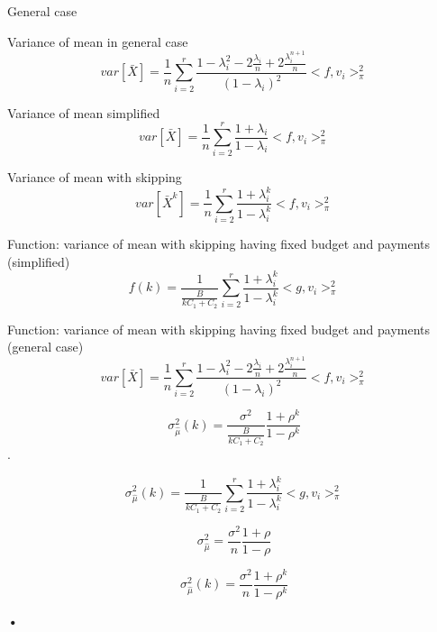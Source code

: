 \documentclass[12pt]{report}
\begin{document}
General case

Variance of mean in general case
$$ var\left[\bar{X} \right] = \frac{1}{n} \sum_{i=2}^r\frac{1-\lambda_i^2 - 2\frac{\lambda_i}{n} + 2\frac{\lambda_i^{n+1}}{n}}{(1 - \lambda_i)^2} <f, v_i>^2_{\pi}$$


Variance of mean simplified
$$ var\left[\bar{X} \right] = \frac{1}{n} \sum_{i=2}^r\frac{1 + \lambda_i}{1 - \lambda_i} <f, v_i>^2_{\pi}$$

Variance of mean with skipping
$$ var\left[\bar{X}^k \right] = \frac{1}{n} \sum_{i=2}^r\frac{1 + \lambda_i^k}{1 - \lambda_i^k} <f, v_i>^2_{\pi}$$

Function: variance of mean with skipping having fixed budget and payments (simplified)
$$ f(k) = \frac{1}{\frac{B}{kC_1 + C_2}} \sum_{i=2}^r\frac{1 + \lambda_i^k}{1 - \lambda_i^k} <g, v_i>^2_{\pi}$$

Function: variance of mean with skipping having fixed budget and payments (general case)
$$ var\left[\bar{X} \right] = \frac{1}{n} \sum_{i=2}^r\frac{1-\lambda_i^2 - 2\frac{\lambda_i}{n} + 2\frac{\lambda_i^{n+1}}{n}}{(1 - \lambda_i)^2} <f, v_i>^2_{\pi}$$



$$ \sigma_{\hat{\mu}}^2(k) = \frac{\sigma^2}{\frac{B}{kC_1 + C_2}} \frac{1+\rho^{k}}{1-\rho^{k}}$$.

$$  \sigma_{\hat{\mu}}^2(k) = \frac{1}{\frac{B}{kC_1 + C_2}} \sum_{i=2}^r\frac{1 + \lambda_i^k}{1 - \lambda_i^k} <g, v_i>^2_{\pi}$$



$$\sigma_{\hat{\mu}}^2 = \frac{\sigma^2}{n} \frac{1+\rho}{1-\rho}$$

$$\sigma_{\hat{\mu}}^2(k) = \frac{\sigma^2}{n} \frac{1+\rho^k}{1-\rho^k}$$

\textbf{•}
\end{document}
